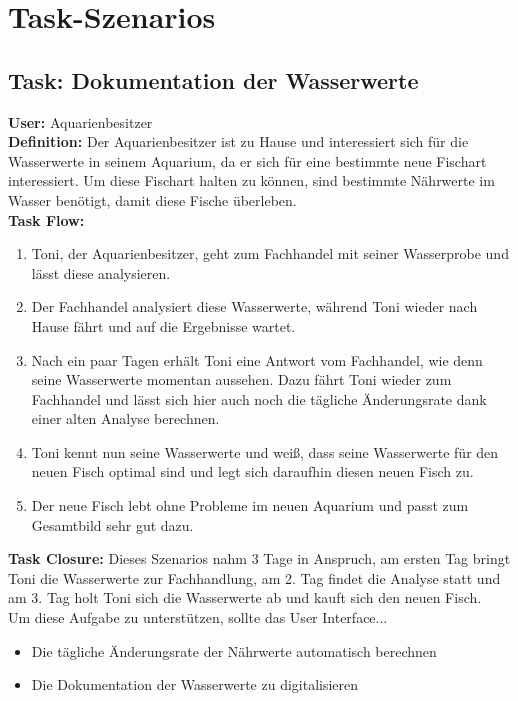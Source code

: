 \section{Task-Szenarios}
\subsection{\textbf{Task:} Dokumentation der Wasserwerte}
\textbf{User:} Aquarienbesitzer\\

\textbf{Definition:} Der Aquarienbesitzer ist zu Hause und interessiert sich für die Wasserwerte in seinem Aquarium, da er sich für eine bestimmte neue Fischart interessiert. Um diese Fischart halten zu können, sind bestimmte Nährwerte im Wasser benötigt, damit diese Fische überleben.\\

\textbf{Task Flow:}
\begin{enumerate}
 	\item Toni, der Aquarienbesitzer, geht zum Fachhandel mit seiner Wasserprobe und lässt diese analysieren.
 	\item Der Fachhandel analysiert diese Wasserwerte, während Toni wieder nach Hause fährt und auf die Ergebnisse wartet.
 	\item Nach ein paar Tagen erhält Toni eine Antwort vom Fachhandel, wie denn seine Wasserwerte momentan aussehen. Dazu fährt Toni wieder zum Fachhandel und lässt sich  hier auch noch die tägliche Änderungsrate dank einer alten Analyse berechnen.
 	\item Toni kennt nun seine Wasserwerte und weiß, dass seine Wasserwerte für den neuen Fisch optimal sind und legt sich daraufhin diesen neuen Fisch zu.
	 \item Der neue Fisch lebt ohne Probleme im neuen Aquarium und passt zum Gesamtbild sehr gut dazu.
\end{enumerate}
\textbf{Task Closure:} Dieses Szenarios nahm 3 Tage in Anspruch, am ersten Tag bringt Toni die Wasserwerte zur Fachhandlung, am 2. Tag findet die Analyse statt und am 3. Tag holt Toni sich die Wasserwerte ab und kauft sich den neuen Fisch.\\

Um diese Aufgabe zu unterstützen, sollte das User Interface...
\begin{itemize}
  \item Die tägliche Änderungsrate der Nährwerte automatisch berechnen
  \item Die Dokumentation der Wasserwerte zu digitalisieren
\end{itemize}	


